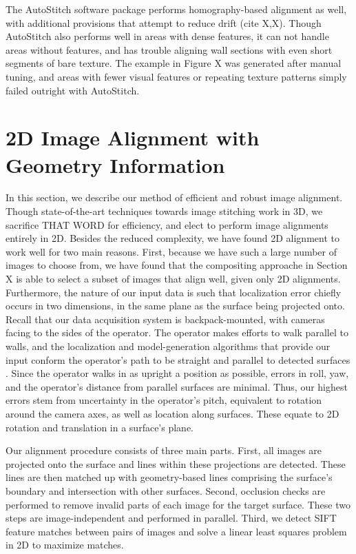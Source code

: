\documentclass[]{spie}  %
\begin{document}
The AutoStitch software package performs homography-based alignment as
well, with additional provisions that attempt to reduce drift (cite
X,X). Though AutoStitch also performs well in areas with dense
features, it can not handle areas without features, and has trouble
aligning wall sections with even short segments of bare texture. The
example in Figure X was generated after manual tuning, and areas with
fewer visual features or repeating texture patterns simply failed
outright with AutoStitch.



\section{2D Image Alignment with Geometry Information}
\label{sec:2dAlignment}

In this section, we describe our method of efficient and robust image
alignment. Though state-of-the-art techniques towards image stitching
work in 3D, we sacrifice THAT WORD for efficiency, and elect to
perform image alignments entirely in 2D. Besides the reduced
complexity, we have found 2D alignment to work well for two main
reasons. First, because we have such a large number of images to
choose from, we have found that the compositing approache in Section X
is able to select a subset of images that align well, given only 2D
alignments. Furthermore, the nature of our input data is such that
localization error chiefly occurs in two dimensions, in the same plane
as the surface being projected onto. Recall that our data acquisition
system is backpack-mounted, with cameras facing to the sides of the
operator. The operator makes efforts to walk parallel to walls, and
the localization and model-generation algorithms that provide our
input conform the operator's path to be straight and parallel to
detected surfaces \cite{kua2012loopclosure, sanchez2012point}. Since
the operator walks in as upright a position as possible, errors in
roll, yaw, and the operator's distance from parallel surfaces are
minimal. Thus, our highest errors stem from uncertainty in the
operator's pitch, equivalent to rotation around the camera axes, as
well as location along surfaces. These equate to 2D rotation and
translation in a surface's plane.

Our alignment procedure consists of three main parts. First, all
images are projected onto the surface and lines within these
projections are detected. These lines are then matched up with
geometry-based lines comprising the surface's boundary and
intersection with other surfaces. Second, occlusion checks are
performed to remove invalid parts of each image for the target
surface. These two steps are image-independent and performed in
parallel. Third, we detect SIFT feature matches between pairs of
images and solve a linear least squares problem in 2D to maximize
matches.
\end{document}
